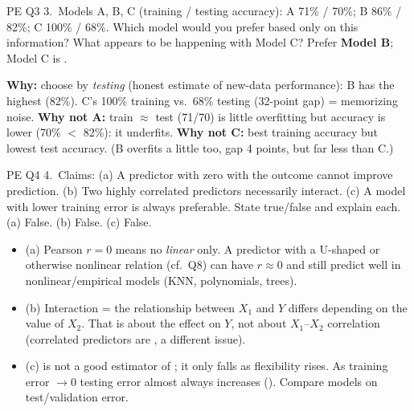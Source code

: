 \begin{qbox}{PE Q3}
3.~Models A, B, C (training / testing accuracy): A 71\% / 70\%; B 86\% / 82\%; C 100\% / 68\%. Which model would you prefer based only on this information? What appears to be happening with Model C?
\ans Prefer \textbf{Model B}; Model C is .\par
\textbf{Why:} choose by \emph{testing}  (honest estimate of new-data performance): B has the highest (82\%). C's 100\% training vs.\ 68\% testing (32-point gap) = memorizing noise. \textbf{Why not A:} train $\approx$ test (71/70) is little overfitting but accuracy is lower (70\% $<$ 82\%): it underfits. \textbf{Why not C:} best training accuracy but lowest test accuracy. (B overfits a little too, gap 4 points, but far less than C.) 
\end{qbox}

\begin{qbox}{PE Q4}
4.~Claims: (a) A predictor with zero  with the outcome cannot improve prediction. (b) Two highly correlated predictors necessarily interact. (c) A model with lower training error is always preferable. State true/false and explain each.
\ans (a) False. (b) False. (c) False.
\begin{itemize}[leftmargin=1em,itemsep=0pt]
\item (a) Pearson $r=0$ means no \emph{linear}  only. A predictor with a U-shaped or otherwise nonlinear relation (cf.\ Q8) can have $r\approx0$ and still predict well in nonlinear/empirical models (KNN, polynomials, trees).
\item (b) Interaction = the relationship between $X_1$ and $Y$ differs depending on the value of $X_2$. That is about the effect on $Y$, not about $X_1$--$X_2$ correlation (correlated predictors are , a different issue).
\item (c)  is not a good estimator of ; it only falls as flexibility rises. As training error $\to0$ testing error almost always increases (). Compare models on test/validation error.
\end{itemize}
\end{qbox}

